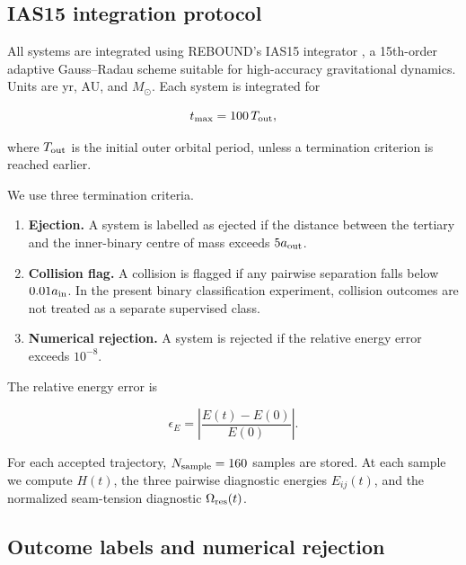 \documentclass[12pt,a4paper]{article}
\newcommand{\Eij}{E_{ij}}
\newcommand{\Ores}{\Omega_{\rm res}}
\newcommand{\Msun}{M_\odot}
\newcommand{\Tout}{T_{\rm out}}
\begin{document}
\subsection{IAS15 integration protocol}
\label{sec:integration_protocol}

All systems are integrated using REBOUND's IAS15 integrator \citep{Rein2012,Rein2015}, a 15th-order adaptive Gauss--Radau scheme suitable for high-accuracy gravitational dynamics. Units are yr, AU, and \(\Msun\). Each system is integrated for

\begin{equation}
    t_{\max}=100\,\Tout,
\end{equation}

where \(\Tout\) is the initial outer orbital period, unless a termination criterion is reached earlier.

We use three termination criteria.

\begin{enumerate}[label=(\roman*)]
    \item \textbf{Ejection.} A system is labelled as ejected if the distance between the tertiary and the inner-binary centre of mass exceeds \(5a_{\rm out}\).
    \item \textbf{Collision flag.} A collision is flagged if any pairwise separation falls below \(0.01a_{\rm in}\). In the present binary classification experiment, collision outcomes are not treated as a separate supervised class.
    \item \textbf{Numerical rejection.} A system is rejected if the relative energy error exceeds \(10^{-8}\).
\end{enumerate}

The relative energy error is

\begin{equation}
    \epsilon_E =
    \left|
    \frac{E(t)-E(0)}{E(0)}
    \right|.
    \label{eq:energy_error}
\end{equation}

For each accepted trajectory, \(N_{\rm sample}=160\) samples are stored. At each sample we compute \(H(t)\), the three pairwise diagnostic energies \(\Eij(t)\), and the normalized seam-tension diagnostic \(\Ores(t)\).

\subsection{Outcome labels and numerical rejection}
\label{sec:outcome_statistics}
\end{document}
